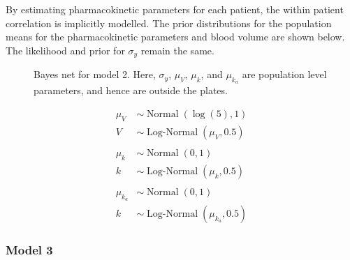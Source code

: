 By estimating pharmacokinetic parameters for each patient, the within patient correlation is implicitly modelled. The prior distributions for the population means for the pharmacokinetic parameters and blood volume are shown below.  The likelihood and prior for $\sigma_y$ remain the same.

\begin{figure}[h!]
	
	\centering
	\caption[Bayes net for second pharmacokinetic model]{Bayes net for model 2.  Here, $\sigma_y$, $\mu_V$, $\mu_k$, and $\mu_{k_a}$ are population level parameters, and hence are outside the plates.}
	\label{model_2}
\end{figure}

\begin{align}
	\mu_V &\sim  \operatorname{Normal}(\log(5),1)\\
	V &\sim \operatorname{Log-Normal}(\mu_V, 0.5)\\ \nonumber\\
	\mu_k &\sim \operatorname{Normal}(0,1)\\
	k &\sim \operatorname{Log-Normal}(\mu_k,0.5)\\ \nonumber\\
	\mu_{k_a} &\sim \operatorname{Normal}(0,1)\\
	k &\sim \operatorname{Log-Normal}(\mu_{k_a},0.5)
\end{align}


\subsubsection{Model 3}

